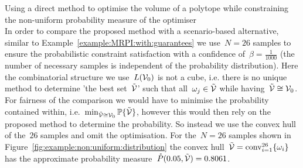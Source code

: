 \begin{example}{Using a direct method to optimise the volume of a polytope while constraining the non-uniform probability measure of the optimiser}
%
\\[1em]
%
In order to compare the proposed method with a scenario-based alternative, similar to Example~\ref{example:MRPI:with:guarantees} we use~$N=26$ samples to ensure the probabilistic constraint satisfaction with a confidence of~$\beta=\frac{1}{1000}$ (the number of necessary samples is independent of the probability distribution).
%
Here the combinatorial structure we use~$L(\mathcal V_0)$ is not a cube, i.e. there is no unique method to determine 'the best set~$\tilde{\mathcal V}$' such that all~$\omega_j\in\tilde{\mathcal V}$ while having~$\tilde{\mathcal V}\cong\mathcal V_0$.
%
For fairness of the comparison we would have to minimise the probability contained within, i.e.~$\min_{\tilde{\mathcal V}\cong\mathcal V_0}\mathbb P\{\tilde{\mathcal V}\}$, however this would then rely on the proposed method to determine the probability.
%
So instead we use the convex hull of the~$26$ samples and omit the optimisation.
%
For the~$N=26$ samples shown in Figure~\ref{fig:example:non:uniform:distribution} the convex hull~$\tilde{\mathcal V}=\text{conv}_{i=1}^{26}\{\omega_i\}$ has the approximate probability measure~$\mathring{P}(0.05,\tilde{\mathcal V})=0.8061$.


\end{example}
